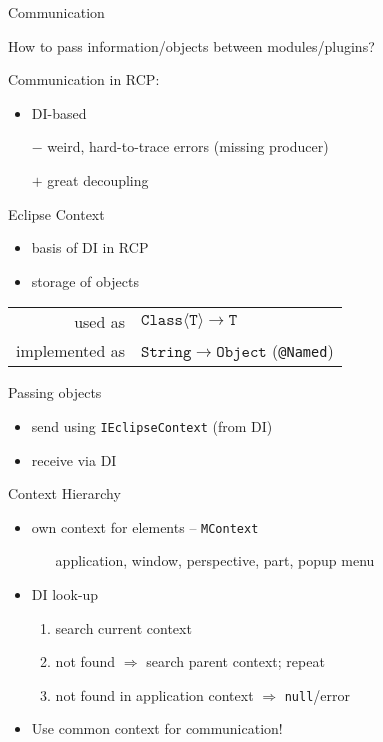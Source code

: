 \documentclass{beamer}
\makeatletter
\newcommand{\@eg}{\raisebox{-0.5mm}{\HandRight}}
\def\eg{\@ifstar{\textcolor{ice}{\@eg}}{\textcolor{pumpkin}{\@eg}}}
\newcommand{\fig}{\textcolor{pumpkin}{\raisebox{-0.5mm}{\PencilRightDown}}}
\newcommand{\str}[1]{\structure{#1}}
\newenvironment{centerblock}{\begin{block}{}\begin{center}}{\end{center}\end{block}}
\newcommand{\ttt}[1]{\texttt{\color{honey}#1}}
\newcommand{\mtt}[1]{\ensuremath{\mathtt{#1}}}
\newcommand{\singleindent}[1]{\begin{itemize}\item[] #1\end{itemize}}
\makeatother
\begin{document}
\begin{frame}{Communication}%
	\begin{centerblock}How to pass information/objects between modules/plugins?\end{centerblock}

	\medskip

	Communication in RCP:
	\begin{itemize}
		\item DI-based
		\item[$-$] weird, hard-to-trace errors (missing producer)
		\item[$+$] great decoupling
	\end{itemize}
\end{frame}%
\begin{frame}{Eclipse Context}%
	\begin{itemize}
		\item basis of DI in RCP
		\item storage of objects
	\end{itemize}
	\begin{centerblock}\begin{tabular}{rl}
		used as & $\mtt{Class\langle T\rangle}\to\mtt{T}$\\
		implemented as & $\mtt{String} \to \mtt{Object}$ (\ttt{@Named})\\
	\end{tabular}\end{centerblock}
	Passing objects \eg
	\begin{itemize}
		\item send using \ttt{IEclipseContext} (from DI)
		\item receive via DI
	\end{itemize}
\end{frame}%
\begin{frame}{Context Hierarchy}%
	\begin{itemize}
		\item own context for \str{app model} elements -- \ttt{MContext}\\
			\singleindent{application, window, perspective, part, popup menu}

		\item DI look-up \fig
			\begin{enumerate}
				\item search current context
				\item not found $\Rightarrow$ search parent context; \alert{repeat}
				\item not found in application context $\Rightarrow$ \texttt{null}/error
			\end{enumerate}

		\item \alert{Use common context for communication!} \eg
	\end{itemize}
\end{frame}%
\end{document}
